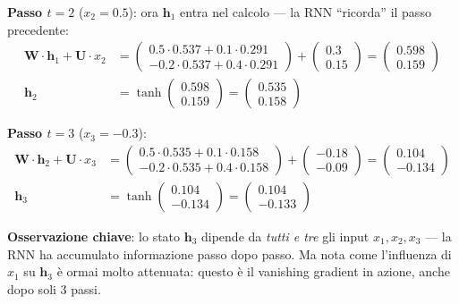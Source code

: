 \documentclass[12pt,a4paper]{article}
\begin{document}
\begin{examplebox}
\textbf{Passo $t = 2$} ($x_2 = 0.5$): ora $\mathbf{h}_1$ entra nel calcolo --- la RNN ``ricorda'' il passo precedente:
\begin{align*}
    \mathbf{W} \cdot \mathbf{h}_1 + \mathbf{U} \cdot x_2 &= \begin{pmatrix} 0.5 \cdot 0.537 + 0.1 \cdot 0.291 \\ -0.2 \cdot 0.537 + 0.4 \cdot 0.291 \end{pmatrix} + \begin{pmatrix} 0.3 \\ 0.15 \end{pmatrix} = \begin{pmatrix} 0.598 \\ 0.159 \end{pmatrix} \\
    \mathbf{h}_2 &= \tanh\begin{pmatrix} 0.598 \\ 0.159 \end{pmatrix} = \begin{pmatrix} 0.535 \\ 0.158 \end{pmatrix}
\end{align*}

\textbf{Passo $t = 3$} ($x_3 = -0.3$):
\begin{align*}
    \mathbf{W} \cdot \mathbf{h}_2 + \mathbf{U} \cdot x_3 &= \begin{pmatrix} 0.5 \cdot 0.535 + 0.1 \cdot 0.158 \\ -0.2 \cdot 0.535 + 0.4 \cdot 0.158 \end{pmatrix} + \begin{pmatrix} -0.18 \\ -0.09 \end{pmatrix} = \begin{pmatrix} 0.104 \\ -0.134 \end{pmatrix} \\
    \mathbf{h}_3 &= \tanh\begin{pmatrix} 0.104 \\ -0.134 \end{pmatrix} = \begin{pmatrix} 0.104 \\ -0.133 \end{pmatrix}
\end{align*}

\textbf{Osservazione chiave}: lo stato $\mathbf{h}_3$ dipende da \emph{tutti e tre} gli input $x_1, x_2, x_3$ --- la RNN ha accumulato informazione passo dopo passo. Ma nota come l'influenza di $x_1$ su $\mathbf{h}_3$ \`e ormai molto attenuata: questo \`e il vanishing gradient in azione, anche dopo soli 3 passi.
\end{examplebox}
\end{document}
